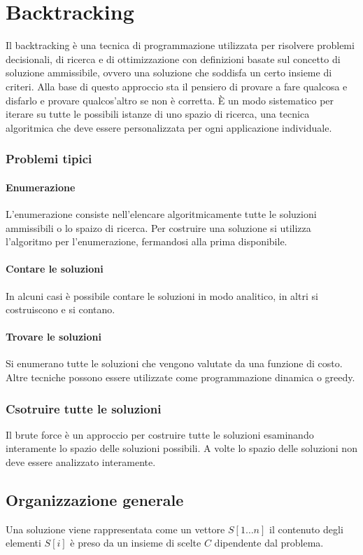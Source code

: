 \chapter{Backtracking}
Il backtracking \`e una tecnica di programmazione utilizzata per risolvere problemi decisionali, di ricerca e di ottimizzazione con definizioni basate sul concetto di soluzione 
ammissibile, ovvero una soluzione che soddisfa un certo insieme di criteri. Alla base di questo approccio sta il pensiero di provare a fare qualcosa e disfarlo e provare qualcos'altro
se non \`e corretta. \`E un modo sistematico per iterare su tutte le possibili istanze di uno spazio di ricerca, una tecnica algoritmica che deve essere personalizzata per ogni
applicazione individuale.
\subsection{Problemi tipici}
\subsubsection{Enumerazione}
L'enumerazione consiste nell'elencare algoritmicamente tutte le soluzioni ammissibili o lo spaizo di ricerca. Per costruire una soluzione si utilizza l'algoritmo per l'enumerazione, 
fermandosi alla prima disponibile.
\subsubsection{Contare le soluzioni}
In alcuni casi \`e possibile contare le soluzioni in modo analitico, in altri si costruiscono e si contano.
\subsubsection{Trovare le soluzioni}
Si enumerano tutte le soluzioni che vengono valutate da una funzione di costo. Altre tecniche possono essere utilizzate come programmazione dinamica o greedy.
\subsection{Csotruire tutte le soluzioni}
Il brute force \`e un approccio per costruire tutte le soluzioni esaminando interamente lo spazio delle soluzioni possibili. A volte lo spazio delle soluzioni non deve essere analizzato
interamente.
\section{Organizzazione generale}
Una soluzione viene rappresentata come un vettore $S[1\dots n]$ il contenuto degli elementi $S[i]$ \`e preso da un insieme di scelte $C$ dipendente dal problema.
